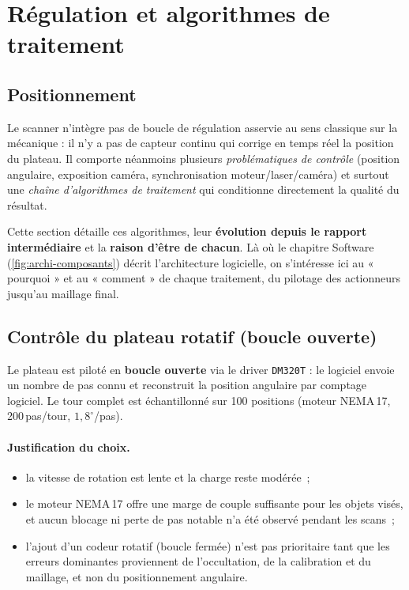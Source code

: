 \section{Régulation et algorithmes de traitement}

\subsection{Positionnement}

Le scanner n'intègre pas de boucle de régulation asservie au sens classique
sur la mécanique : il n'y a pas de capteur continu qui corrige en temps réel
la position du plateau. Il comporte néanmoins plusieurs \emph{problématiques de
contrôle} (position angulaire, exposition caméra, synchronisation
moteur/laser/caméra) et surtout une \emph{chaîne d'algorithmes de traitement}
qui conditionne directement la qualité du résultat.

Cette section détaille ces algorithmes, leur \textbf{évolution depuis le rapport
intermédiaire} et la \textbf{raison d'être de chacun}. Là où le chapitre
Software (\autoref{fig:archi-composants}) décrit l'architecture logicielle,
on s'intéresse ici au « pourquoi » et au « comment » de chaque traitement, du
pilotage des actionneurs jusqu'au maillage final.

\subsection{Contrôle du plateau rotatif (boucle ouverte)}

Le plateau est piloté en \textbf{boucle ouverte} via le driver \texttt{DM320T} :
le logiciel envoie un nombre de pas connu et reconstruit la position angulaire
par comptage logiciel. Le tour complet est échantillonné sur 100 positions
(moteur NEMA\,17, 200\,pas/tour, $1{,}8^\circ$/pas).

\paragraph{Justification du choix.}
\begin{itemize}
  \item la vitesse de rotation est lente et la charge reste modérée~;
  \item le moteur NEMA\,17 offre une marge de couple suffisante pour les objets
        visés, et aucun blocage ni perte de pas notable n'a été observé pendant
        les scans~;
  \item l'ajout d'un codeur rotatif (boucle fermée) n'est pas prioritaire tant
        que les erreurs dominantes proviennent de l'occultation, de la
        calibration et du maillage, et non du positionnement angulaire.
\end{itemize}

